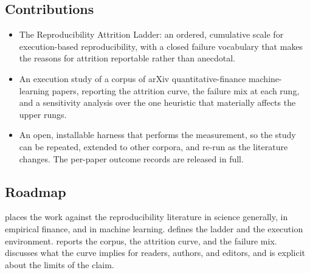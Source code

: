 \subsection{Contributions}\label{sec:contributions}

\begin{itemize}[leftmargin=*]
    \item The Reproducibility Attrition Ladder: an ordered, cumulative scale for
          execution-based reproducibility, with a closed failure vocabulary that
          makes the reasons for attrition reportable rather than anecdotal.
    \item An execution study of a corpus of arXiv quantitative-finance
          machine-learning papers, reporting the attrition curve, the failure mix
          at each rung, and a sensitivity analysis over the one heuristic that
          materially affects the upper rungs.
    \item An open, installable harness that performs the measurement, so the
          study can be repeated, extended to other corpora, and re-run as the
          literature changes. The per-paper outcome records are released in full.
\end{itemize}

\subsection{Roadmap}\label{sec:roadmap}

 places the work against the reproducibility literature in
science generally, in empirical finance, and in machine learning.
 defines the ladder and the execution environment.
 reports the corpus, the attrition curve, and the failure mix.
 discusses what the curve implies for readers, authors, and
editors, and is explicit about the limits of the claim.
